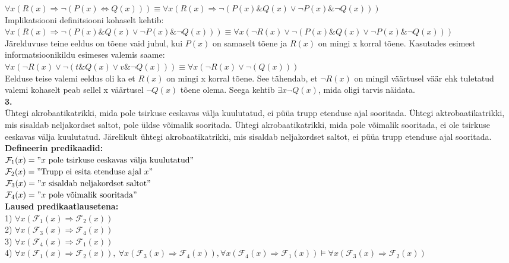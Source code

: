 \documentclass{article}
\begin{document}
$\forall x(R(x)\Rightarrow \neg(P(x)\Leftrightarrow Q(x)))\equiv\forall x(R(x)\Rightarrow \neg(P(x)\& Q(x)\vee\neg P(x)\& \neg Q(x)))$\\
Implikatsiooni definitsiooni kohaselt kehtib:\\
$\forall x(R(x)\Rightarrow \neg(P(x)\& Q(x)\vee\neg P(x)\& \neg Q(x)))\equiv\forall x(\neg R(x)\vee \neg(P(x)\& Q(x)\vee\neg P(x)\& \neg Q(x)))$\\
J\"arelduvuse teine eeldus on t\~oene vaid juhul, kui $P(x)$ on samaselt t\~oene ja $R(x)$ on mingi x korral t\~oene. Kasutades esimest informatsioonikildu esimeses valemis saame:\\
$\forall x(\neg R(x)\vee \neg(t\& Q(x)\vee v\& \neg Q(x)))\equiv\forall x(\neg R(x)\vee \neg(Q(x)))$\\
Eelduse teise valemi eeldus oli ka et $R(x)$ on mingi x korral t\~oene. See t\"ahendab, et $\neg R(x)$ on mingil v\"a\"artusel v\"a\"ar ehk tuletatud valemi kohaselt peab sellel x v\"a\"artusel $\neg Q(x)$ t\~oene olema. Seega kehtib $\exists x\neg Q(x)$, mida oligi tarvis n\"aidata.
\pagebreak\\
\textbf{3.}\\
\"Uhtegi akrobaatikatrikki, mida pole tsirkuse eeskavas v\"alja kuulutatud, ei p\"u\"ua trupp etenduse ajal sooritada. \"Uhtegi aktrobaatikatrikki, mis sisaldab neljakordset saltot, pole \"uldse v\~oimalik sooritada. \"Uhtegi akrobaatikatrikki, mida pole v\~oimalik sooritada, ei ole tsirkuse eeskavas v\"alja kuulutatud. J\"arelikult \"uhtegi akrobaatikatrikki, mis sisaldab neljakordset saltot, ei p\"u\"ua trupp etenduse ajal sooritada.\\
\textbf{Defineerin predikaadid:}\\
$\mathcal{F}_1(x)="x\text{ pole tsirkuse eeskavas v\"alja kuulutatud}"$\\
$\mathcal{F}_2(x)="\text{Trupp ei esita etenduse ajal }x"$\\
$\mathcal{F}_3(x)="x\text{ sisaldab neljakordset saltot}"$\\
$\mathcal{F}_4(x)="x\text{ pole v\~oimalik sooritada}"$\\
\textbf{Laused predikaatlausetena:}\\
1) $\forall x(\mathcal{F}_1(x)\Rightarrow \mathcal{F}_2(x))$\\
2) $\forall x(\mathcal{F}_3(x)\Rightarrow \mathcal{F}_4(x))$\\
3) $\forall x(\mathcal{F}_4(x)\Rightarrow \mathcal{F}_1(x))$\\
4) $\forall x(\mathcal{F}_1(x)\Rightarrow \mathcal{F}_2(x)),\ \forall x(\mathcal{F}_3(x)\Rightarrow \mathcal{F}_4(x)), \forall x(\mathcal{F}_4(x)\Rightarrow \mathcal{F}_1(x))\models\forall x(\mathcal{F}_3(x)\Rightarrow \mathcal{F}_2(x))$\\
\end{document}
